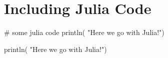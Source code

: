 \documentclass[]{article}
\begin{document}
\section{Including Julia Code}

\begin{jllisting}
	# some julia code
	println( "Here we go with Julia!")
\end{jllisting}


\begin{jllisting}[caption={This is a caption}, label=mylabel]
	println( "Here we go with Julia!")
\end{jllisting}
\end{document}
